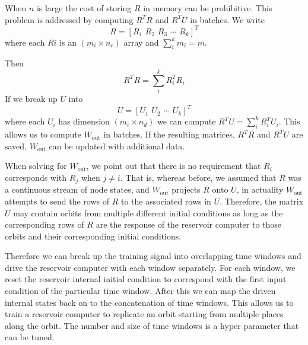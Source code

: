 \documentclass[journal]{journal}
\begin{document}
When $n$ is large the cost of storing $R$ in memory can be prohibitive. This problem is addressed by computing $R^TR$ and $R^TU$ in batches. We write
\[
R = [
R_1 \, \,
R_2 \, \,
R_3 \, \,
\cdots  \, \,
R_k
]^T
\]
where each $Ri$ is an $(m_i \times n_r)$ array and $\sum_i^k m_i = m$.

Then 
\[
R^TR = \sum_i^k R_i^T R_i
\]
If we break up $U$ into 
\[
U = 
[ U_1 \, \, U_2 \, \,  \cdots \, \, U_k ] ^T
\]
where each $U_i$ has dimension $(m_i \times n_d)$ we can compute $R^TU = \sum_i^k R_i^T U_i$. This allows us to compute $W_\text{out}$ in batches. If the resulting matrices, $R^TR$ and $R^TU$ are saved, $W_\text{out}$ can be updated with additional data.

When solving for $W_\text{out}$, we point out that there is no requirement that $R_i$ corresponds with $R_j$ when $j \neq i$. That is, whereas before, we assumed that $R$ was a continuous stream of node states, and $W_\text{out}$ projects $R$ onto $U$, in actuality $W_\text{out}$ attempts to send the rows of $R$ to the associated rows in $U$. Therefore, the matrix $U$ may contain orbits from multiple different initial conditions as long as the corresponding rows of $R$ are the response of the reservoir computer to those orbits and their corresponding initial conditions.

Therefore we can break up the training signal into overlapping time windows and drive the reservoir computer with each window separately. For each window, we reset the reservoir internal initial condition to correspond with the first input condition of the particular time window.  After this we can map the driven internal states back on to the concatenation of time windows. This allows us to train a reservoir computer to replicate an orbit starting from multiple places along the orbit. The number and size of time windows is a hyper parameter that can be tuned.
\end{document}
